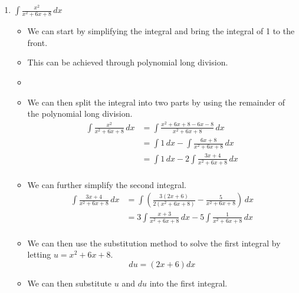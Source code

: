 \documentclass[12pt]{article}
\begin{document}
\begin{enumerate}[leftmargin=\labelsep]
\begin{enumerate}
        \newpage
        \item $\displaystyle{\int \frac{x^2}{x^2+6x+8} \, dx}$
        \begin{itemize}[label={}]
            \item We can start by simplifying the integral and bring the integral of 1 to the front.
            \item This can be achieved through polynomial long division.
            \begin{center}
            \end{center}
            \item
            \item We can then split the integral into two parts by using the remainder of the polynomial long division.
            \begin{equation*}
                \begin{split}
                    \int \frac{x^2}{x^2+6x+8} \, dx &= \int \frac{x^2+6x+8-6x-8}{x^2+6x+8} \, dx \\
                    &= \int 1 \, dx - \int \frac{6x+8}{x^2+6x+8} \, dx \\
                    &= \int 1 \, dx - 2 \int \frac{3x+4}{x^2+6x+8} \, dx \\
                \end{split}
            \end{equation*}
            \item We can further simplify the second integral.
            \begin{equation*}
                \begin{split}
                    \int \frac{3x+4}{x^2+6x+8} \, dx &= \int \left( \frac{3(2x+6)}{2(x^2+6x+8)} - \frac{5}{x^2+6x+8} \right) \, dx \\
                    &= 3 \int \frac{x+3}{x^2+6x+8} \, dx - 5 \int \frac{1}{x^2+6x+8} \, dx \\
                \end{split}
            \end{equation*}
            \item We can then use the substitution method to solve the first integral by letting $u=x^2+6x+8$.
            \begin{equation*}
                du = (2x+6) dx
            \end{equation*}
            \item We can then substitute $u$ and $du$ into the first integral.

\end{itemize}
\end{enumerate}
\end{enumerate}
\end{document}
